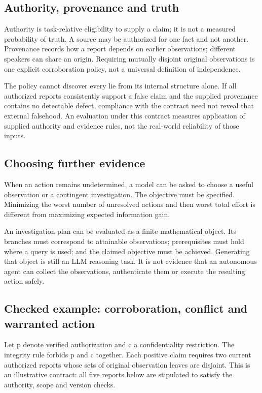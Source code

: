 \documentclass[a4paper,preprint,12pt,numbers,nopreprintline]{elsarticle}
\begin{document}
\subsection{Authority, provenance and truth}

Authority is task-relative eligibility to supply a claim; it is not a measured probability of truth. A source may be authorized for one fact and not another. Provenance records how a report depends on earlier observations; different speakers can share an origin. Requiring mutually disjoint original observations is one explicit corroboration policy, not a universal definition of independence.

The policy cannot discover every lie from its internal structure alone. If all authorized reports consistently support a false claim and the supplied provenance contains no detectable defect, compliance with the contract need not reveal that external falsehood. An evaluation under this contract measures application of supplied authority and evidence rules, not the real-world reliability of those inputs.

\subsection{Choosing further evidence}

When an action remains undetermined, a model can be asked to choose a useful observation or a contingent investigation. The objective must be specified. Minimizing the worst number of unresolved actions and then worst total effort is different from maximizing expected information gain.

An investigation plan can be evaluated as a finite mathematical object. Its branches must correspond to attainable observations; prerequisites must hold where a query is used; and the claimed objective must be achieved. Generating that object is still an LLM reasoning task. It is not evidence that an autonomous agent can collect the observations, authenticate them or execute the resulting action safely.

\subsection{Checked example: corroboration, conflict and warranted action}

Let p denote verified authorization and c a confidentiality restriction. The integrity rule forbids p and c together. Each positive claim requires two current authorized reports whose sets of original observation leaves are disjoint. This is an illustrative contract: all five reports below are stipulated to satisfy the authority, scope and version checks.
\end{document}
